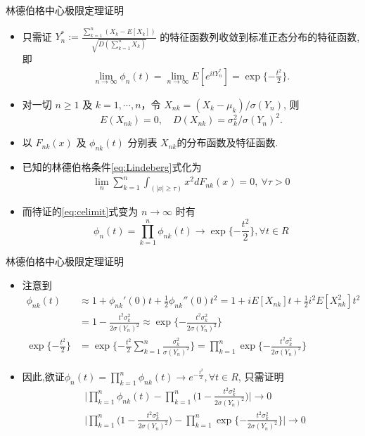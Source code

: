 \begin{frame}{林德伯格中心极限定理证明}
\begin{itemize}
	\item 只需证 $Y_n^*:=\frac{\sum_{k=1}^n(X_k-E[X_k])}{\sqrt{D(\sum_{k=1}^nX_k)}}$ 的特征函数列收敛到标准正态分布的特征函数,即
	\begin{align}\label{eq:celimit}
		\lim_{n\rightarrow\infty}\phi_{n}(t)=\lim_{n\rightarrow\infty}E[e^{itY_n^*}]= \exp\{-\frac{t^2}{2}\}.
	\end{align}

    \item 对一切 $n \geq 1$ 及 $k=1, \cdots, n$，令 $X_{nk}=\left(X_{k}-\mu_k\right) / \sigma(Y_n)$, 则
	\[E\left(X_{nk}\right)=0,\quad D\left(X_{nk}\right)=\sigma_k^{2} / \sigma(Y_n)^{2}.\]
	\item 以 $F_{n k}(x)$ 及 $\phi_{n k}(t)$ 分别表 $X_{nk}$的分布函数及特征函数.
		\item 已知的林德伯格条件\eqref{eq:Lindeberg}式化为
		\begin{align}\label{eq:Lindebergcondi-2}
			\lim _{n} \sum_{k=1}^{n} \int_{(|x| \geq \tau)} x^{2} d F_{n k}(x)=0, \ \forall \tau>0
		\end{align}

	\item
		而待证的\eqref{eq:celimit}式变为 $n \rightarrow \infty$ 时有
		\[
		\phi_{n}(t)=\prod_{k=1}^{n} \phi_{n k}(t) \longrightarrow \exp\{-\frac{t^2}{2}\},  \forall t \in R
		\]

\end{itemize}

\end{frame}
\begin{frame}{林德伯格中心极限定理证明}
	\begin{itemize}
		\item 注意到
		\begin{align*}
		  \phi_{nk}(t)&\approx 1+\phi_{nk}'(0)t+\frac{1}{2}\phi_{nk}''(0)t^2=1+iE[X_{nk}]t+\frac{1}{2}i^2E[X_{nk}^2]t^2\\
					&=1-\frac{t^2\sigma_k^2}{2\sigma(Y_n)^2}\approx \exp\{-\frac{t^2\sigma_k^2}{2\sigma(Y_n)^2}\}\\
			\exp\{-\frac{t^2}{2}\}&=\exp\{-\frac{t^2}{2}\sum_{k=1}^n\frac{\sigma_k^2}{\sigma(Y_n)^2}\}=\prod_{k=1}^{n} \exp\{-\frac{t^2\sigma_k^2}{2\sigma(Y_n)^2}\}
		\end{align*}
		\item 因此,欲证$\phi_{n}(t)=\prod_{k=1}^{n} \phi_{n k}(t) \longrightarrow e^{-\frac{t^{2}}{2}},  \forall t \in R$, 只需证明
		\begin{align*}
	&\big|\prod_{k=1}^{n} \phi_{n k}(t)-\prod_{k=1}^{n}\big(1-\frac{t^{2} \sigma_{k}^{2}}{2 \sigma(Y_n)^2}\big)\big| \longrightarrow 0\\
	&\big|\prod_{k=1}^{n}\big(1-\frac{t^{2} \sigma_{k}^{2}}{2 \sigma(Y_n)^2}\big)-\prod_{k=1}^{n} \exp\{-\frac{t^2\sigma_k^2}{2\sigma(Y_n)^2}\}\big| \longrightarrow 0
		\end{align*}
	\end{itemize}


	\end{frame}
